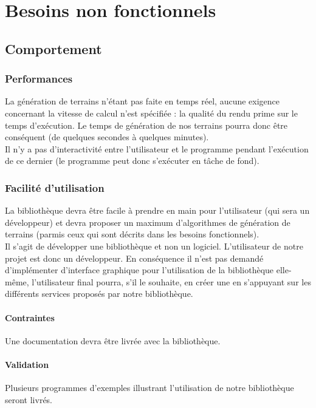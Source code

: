 \chapter{Besoins non fonctionnels}

\section{Comportement}

\subsection{Performances}
La génération de terrains n'étant pas faite en temps réel, aucune exigence
concernant la vitesse de calcul n'est spécifiée : la qualité du rendu prime sur
le temps d'exécution. Le temps de génération de nos terrains pourra donc \^etre conséquent (de quelques secondes à quelques minutes).\\

Il n'y a pas d'interactivité entre l'utilisateur et le programme pendant l'exécution de ce dernier (le programme peut donc s'exécuter en tâche de fond).\\

\subsection{Facilité d'utilisation}
La bibliothèque devra \^etre facile à prendre en main pour l'utilisateur (qui sera un développeur) et devra proposer un maximum d'algorithmes de génération de terrains (parmis ceux qui sont décrits dans les besoins fonctionnels).\\

Il s'agit de développer une bibliothèque et non un logiciel. L'utilisateur
de notre projet est donc un développeur. En conséquence il n'est pas demandé
d'implémenter d'interface graphique pour l'utilisation de la bibliothèque elle-m\^eme, l'utilisateur final pourra, s'il le souhaite, en créer une en s'appuyant sur les différents services proposés par notre bibliothèque.\\

\subsubsection{Contraintes}
Une documentation devra être livrée avec la bibliothèque.

\subsubsection{Validation}
Plusieurs programmes d'exemples illustrant l'utilisation de notre bibliothèque seront livrés.

